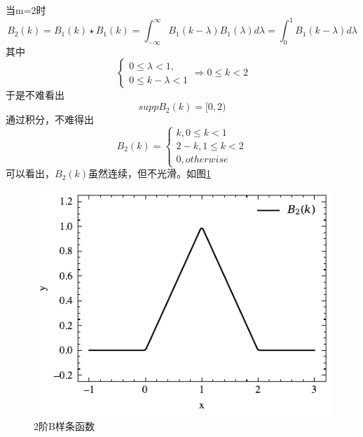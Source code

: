 当m=2时
\begin{equation*}
    B_{2}(k)=B_{1}(k)\star B_{1}(k)=\int_{-\infty}^{\infty}B_{1}(k-\lambda)B_{1}(\lambda)d\lambda=
\int_{0}^{1}B_{1}(k-\lambda)d\lambda
\end{equation*}
其中
\begin{equation*}
    \left\{\begin{matrix} 
0 \le \lambda <1,\\
0\le k-\lambda <1
\end{matrix}\right. 
\Rightarrow 0\le k <2
\end{equation*}
于是不难看出
\begin{equation}
    supp B_2(k)=[0,2)
\end{equation}
通过积分，不难得出
\begin{equation}
B_2(k)=
    \left\{\begin{matrix} 
k,0\le k<1\\
2-k,1\le k<2\\
0,otherwise
\end{matrix}\right. 
\end{equation}
可以看出，$B_2(k)$虽然连续，但不光滑。如图\ref{B2}
\begin{figure}[htbp]
    \centering
    \includegraphics[width=0.76\linewidth]{figures/B-splin/B2.pdf}
    \caption{2阶B样条函数}
    \label{B2}
\end{figure}

